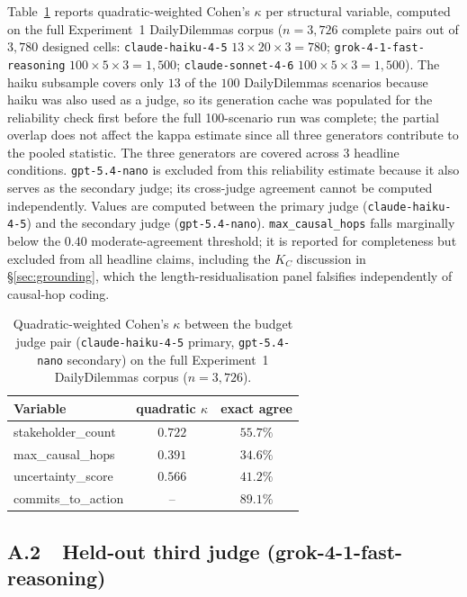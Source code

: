 \documentclass[11pt]{article}
\begin{document}
Table~\ref{tab:kappa} reports quadratic-weighted Cohen's $\kappa$
\citep{cohen60} per structural variable, computed on the full
Experiment~1 DailyDilemmas corpus ($n = 3{,}726$ complete pairs out of
$3{,}780$ designed cells: \texttt{claude-haiku-4-5} $13 \times 20 \times 3 = 780$;
\texttt{grok-4-1-fast-reasoning} $100 \times 5 \times 3 = 1{,}500$;
\texttt{claude-sonnet-4-6} $100 \times 5 \times 3 = 1{,}500$).
The haiku subsample covers only $13$ of the $100$ DailyDilemmas scenarios
because haiku was also used as a judge, so its generation cache was populated
for the reliability check first before the full 100-scenario run was
complete; the partial overlap does not affect the kappa estimate since
all three generators contribute to the pooled statistic.
The three generators are covered across $3$ headline conditions. \texttt{gpt-5.4-nano} is excluded from
this reliability estimate because it also serves as the secondary judge;
its cross-judge agreement cannot be computed independently.
Values are computed between the primary judge (\texttt{claude-haiku-4-5})
and the secondary judge (\texttt{gpt-5.4-nano}).
\texttt{max\_causal\_hops} falls marginally below the $0.40$
moderate-agreement threshold; it is reported for completeness but
excluded from all headline claims, including the $K_C$ discussion in
\S\ref{sec:grounding}, which the length-residualisation panel
falsifies independently of causal-hop coding.

\begin{table}[t]
\centering
\small
\begin{tabular}{lcc}
\toprule
Variable & quadratic $\kappa$ & exact agree \\
\midrule
stakeholder\_count  & $0.722$ & $55.7\%$ \\
max\_causal\_hops   & $0.391$ & $34.6\%$ \\
uncertainty\_score  & $0.566$ & $41.2\%$ \\
commits\_to\_action & --      & $89.1\%$ \\
\bottomrule
\end{tabular}
\caption{Quadratic-weighted Cohen's $\kappa$ between the budget judge pair
(\texttt{claude-haiku-4-5} primary, \texttt{gpt-5.4-nano} secondary) on
the full Experiment~1 DailyDilemmas corpus ($n = 3{,}726$).}
\label{tab:kappa}
\end{table}

\subsection*{A.2~~Held-out third judge (grok-4-1-fast-reasoning)}
\end{document}

